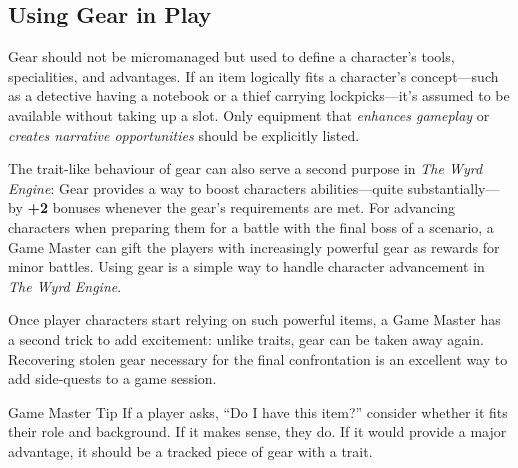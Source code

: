\subsection{Using Gear in Play}
Gear should not be micromanaged but used to define a character’s tools, specialities, and advantages. If an item logically fits a character’s concept—such as a detective having a notebook or a thief carrying lockpicks—it’s assumed to be available without taking up a slot. Only equipment that \emph{enhances gameplay} or \emph{creates narrative opportunities} should be explicitly listed.

The trait-like behaviour of gear can also serve a second purpose in \emph{The Wyrd Engine}: Gear provides a way to boost characters abilities---quite substantially---by \textbf{+2} bonuses whenever the gear's requirements are met. For advancing characters when preparing them for a battle with the final boss of a scenario, a Game Master can gift the players with increasingly powerful gear as rewards for minor battles. Using gear is a simple way to handle character advancement in \emph{The Wyrd Engine}.

Once player characters start relying on such powerful items, a Game Master has a second trick to add excitement: unlike traits, gear can be taken away again. Recovering stolen gear necessary for the final confrontation is an excellent way to add side-quests to a game session.

\begin{DndComment}{Game Master Tip}
	If a player asks, “Do I have this item?” consider whether it fits their role and background. If it makes sense, they do. If it would provide a major advantage, it should be a tracked piece of gear with a trait.
\end{DndComment}

